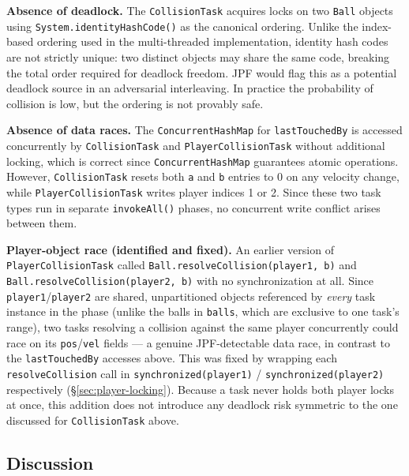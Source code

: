 \documentclass[12pt,a4paper]{article}
\begin{document}
\textbf{Absence of deadlock.} The \texttt{CollisionTask} acquires locks
on two \texttt{Ball} objects using \texttt{System.identityHashCode()} as
the canonical ordering. Unlike the index-based ordering used in the
multi-threaded implementation, identity hash codes are not strictly unique:
two distinct objects may share the same code, breaking the total order
required for deadlock freedom. JPF would flag this as a potential deadlock
source in an adversarial interleaving. In practice the probability of
collision is low, but the ordering is not provably safe.
 
\textbf{Absence of data races.} The \texttt{ConcurrentHashMap} for
\texttt{lastTouchedBy} is accessed concurrently by \texttt{CollisionTask}
and \texttt{PlayerCollisionTask} without additional locking, which is
correct since \texttt{ConcurrentHashMap} guarantees atomic operations.
However, \texttt{CollisionTask} resets both \texttt{a} and \texttt{b}
entries to 0 on any velocity change, while \texttt{PlayerCollisionTask}
writes player indices 1 or 2. Since these two task types run in separate
\texttt{invokeAll()} phases, no concurrent write conflict arises between
them.

\textbf{Player-object race (identified and fixed).} An earlier version of
\texttt{PlayerCollisionTask} called \texttt{Ball.resolveCollision(player1, b)}
and \texttt{Ball.resolveCollision(player2, b)} with no synchronization at
all. Since \texttt{player1}/\texttt{player2} are shared, unpartitioned
objects referenced by \textit{every} task instance in the phase (unlike the
balls in \texttt{balls}, which are exclusive to one task's range), two
tasks resolving a collision against the same player concurrently could
race on its \texttt{pos}/\texttt{vel} fields --- a genuine JPF-detectable
data race, in contrast to the \texttt{lastTouchedBy} accesses above. This
was fixed by wrapping each \texttt{resolveCollision} call in
\texttt{synchronized(player1)} / \texttt{synchronized(player2)}
respectively (\S\ref{sec:player-locking}). Because a task never holds both
player locks at once, this addition does not introduce any deadlock risk
symmetric to the one discussed for \texttt{CollisionTask} above.

\subsection{Discussion}
\end{document}
